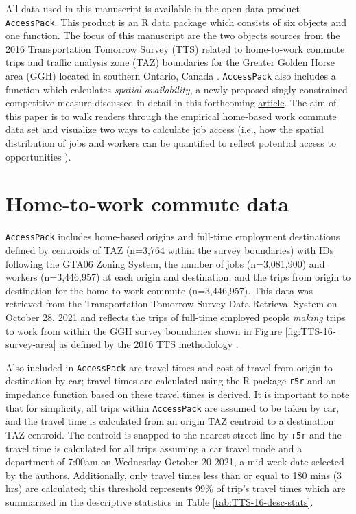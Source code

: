 \documentclass[Royal,times,sageh]{sagej}
\begin{document}
All data used in this manuscript is available in the open data product
\href{https://github.com/soukhova/AccessPack}{\texttt{AccessPack}}. This
product is an R data package which consists of six objects and one
function. The focus of this manuscript are the two objects sources from
the 2016 Transportation Tomorrow Survey (TTS) related to home-to-work
commute trips and traffic analysis zone (TAZ) boundaries for the Greater
Golden Horse area (GGH) located in southern Ontario, Canada
\citep{data_management_group_tts_2018}. \texttt{AccessPack} also
includes a function which calculates \emph{spatial availability}, a
newly proposed singly-constrained competitive measure discussed in
detail in this forthcoming
\href{https://github.com/soukhova/Spatial-Availability-Measure}{article}.
The aim of this paper is to walk readers through the empirical
home-based work commute data set and visualize two ways to calculate job
access (i.e., how the spatial distribution of jobs and workers can be
quantified to reflect potential access to opportunities
\citep{hansen1959}).

\hypertarget{home-to-work-commute-data}{%
\section{Home-to-work commute data}\label{home-to-work-commute-data}}

\texttt{AccessPack} includes home-based origins and full-time employment
destinations defined by centroids of TAZ (n=3,764 within the survey
boundaries) with IDs following the GTA06 Zoning System, the number of
jobs (n=3,081,900) and workers (n=3,446,957) at each origin and
destination, and the trips from origin to destination for the
home-to-work commute (n=3,446,957). This data was retrieved from the
Transportation Tomorrow Survey Data Retrieval System on October 28, 2021
and reflects the trips of full-time employed people \emph{making} trips
to work from within the GGH survey boundaries shown in Figure
\ref{fig:TTS-16-survey-area} as defined by the 2016 TTS methodology
\citep{data_management_group_tts_2018}.

Also included in \texttt{AccessPack} are travel times and cost of travel
from origin to destination by car; travel times are calculated using the
R package \texttt{r5r} \citep{r5r_2021} and an impedance function based
on these travel times is derived. It is important to note that for
simplicity, all trips within \texttt{AccessPack} are assumed to be taken
by car, and the travel time is calculated from an origin TAZ centroid to
a destination TAZ centroid. The centroid is snapped to the nearest
street line by \texttt{r5r} and the travel time is calculated for all
trips assuming a car travel mode and a department of 7:00am on Wednesday
October 20 2021, a mid-week date selected by the authors. Additionally,
only travel times less than or equal to 180 mins (3 hrs) are calculated;
this threshold represents 99\% of trip's travel times which are
summarized in the descriptive statistics in Table
\ref{tab:TTS-16-desc-stats}.
\end{document}
